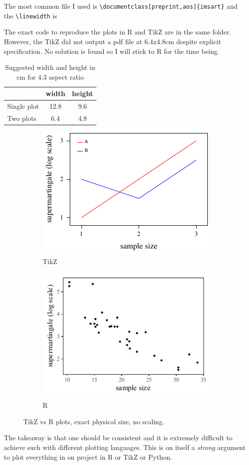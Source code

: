 \documentclass[preprint,aos]{imsart}
\begin{document}
The most common file I used is \verb|\documentclass[preprint,aos]{imsart}|
and the \verb|\linewidth| is \prntlen{\linewidth}

The exact code to reproduce the plots in R and TikZ are in the same folder.
However, the TikZ did not output a pdf file at 6.4x4.8cm despite explicit specification.
No solution is found so I will stick to R for the time being.

\begin{table}[ht]
\centering
\caption{Suggested width and height in cm for 4:3 aspect ratio}
\begin{tabular}{lcc}
\toprule
            & width & height \\
\midrule
Single plot & 12.8  & 9.6    \\
Two plots   & 6.4   & 4.8    \\
\bottomrule
\end{tabular}
\end{table}

\begin{figure}[ht]
    \centering
    \begin{subfigure}[t]{6.4cm}
        \includegraphics{scatterplot-tikz.pdf}
        \caption{TikZ}
    \end{subfigure}
    \hspace{0.5cm} %
    \begin{subfigure}[t]{6.4cm}
        \includegraphics{scatterplot-R.pdf}
        \caption{R}
    \end{subfigure}

    \caption{TikZ vs R plots, exact physical size, no scaling.}
\end{figure}

The takeaway is that one should be consistent and it is extremely 
difficult to achieve such with different plotting languages.
This is on itself a \emph{strong} argument to plot everything 
in on project in R or TikZ or Python.
\end{document}
